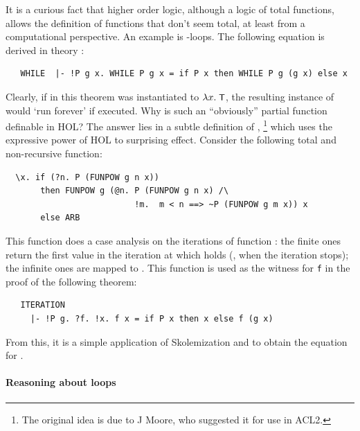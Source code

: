 {It is a curious fact that higher order logic, although a logic of
total functions, allows the definition of functions that don't
seem total, at least from a computational perspective. An example
is -loops. The following equation is derived in theory
:
%
\begin{hol}
\begin{verbatim}
   WHILE  |- !P g x. WHILE P g x = if P x then WHILE P g (g x) else x
\end{verbatim}
\end{hol}
%
Clearly, if  in this theorem was instantiated to $\lambda
x.\;\mbox{\small{\textbf{\sf{T}}}}$, the resulting instance of  would `run
forever' if executed. Why is such an ``obviously'' partial function
definable in HOL?
%
The answer lies in a subtle definition of ,
\footnote{The original idea is due to J Moore,
          who suggested it for use in ACL2.}
which uses the expressive power of HOL to surprising effect. Consider
the following total and non-recursive function:
%
\begin{hol}
\begin{verbatim}
  \x. if (?n. P (FUNPOW g n x))
       then FUNPOW g (@n. P (FUNPOW g n x) /\
                          !m.  m < n ==> ~P (FUNPOW g m x)) x
       else ARB
\end{verbatim}
\end{hol}
%
This function does a case analysis on the iterations of function
\holtxt{g}: the finite ones return the first value in the iteration at
which \holtxt{P} holds (\ie, when the iteration stops); the infinite
ones are mapped to \holtxt{ARB}. This function is used as the witness
for \verb+f+ in the proof of the following theorem:
%
\begin{hol}
\begin{verbatim}
   ITERATION
     |- !P g. ?f. !x. f x = if P x then x else f (g x)
\end{verbatim}
\end{hol}
%
From this, it is a simple application of Skolemization and
 to obtain the equation for .

\paragraph{Reasoning about  loops}

}
